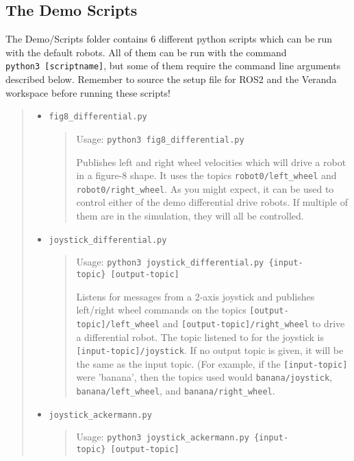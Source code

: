 \hypertarget{the-demo-scripts}{%
\subsection{The Demo Scripts}\label{the-demo-scripts}}

The Demo/Scripts folder contains 6 different python scripts which can be
run with the default robots. All of them can be run with the command
\texttt{python3\ {[}scriptname{]}}, but some of them require the command
line arguments described below. Remember to source the setup file for
ROS2 and the Veranda workspace before running these scripts!

\begin{quote}
\begin{itemize}
\item
  \texttt{fig8\_differential.py}

  \begin{quote}
  Usage: \texttt{python3\ fig8\_differential.py}

  Publishes left and right wheel velocities which will drive a robot in
  a figure-8 shape. It uses the topics \texttt{robot0/left\_wheel} and
  \texttt{robot0/right\_wheel}. As you might expect, it can be used to
  control either of the demo differential drive robots. If multiple of
  them are in the simulation, they will all be controlled.
  \end{quote}
\item
  \texttt{joystick\_differential.py}

  \begin{quote}
  Usage:
  \texttt{python3\ joystick\_differential.py\ \{input-topic\}\ {[}output-topic{]}}

  Listens for messages from a 2-axis joystick and publishes left/right
  wheel commands on the topics \texttt{{[}output-topic{]}/left\_wheel}
  and \texttt{{[}output-topic{]}/right\_wheel} to drive a differential
  robot. The topic listened to for the joystick is
  \texttt{{[}input-topic{]}/joystick}. If no output topic is given, it
  will be the same as the input topic. (For example, if the
  \texttt{{[}input-topic{]}} were 'banana', then the topics used would
  \texttt{banana/joystick}, \texttt{banana/left\_wheel}, and
  \texttt{banana/right\_wheel}.
  \end{quote}
\item
  \texttt{joystick\_ackermann.py}

  \begin{quote}
  Usage:
  \texttt{python3\ joystick\_ackermann.py\ \{input-topic\}\ {[}output-topic{]}}


\end{quote}
\end{itemize}
\end{quote}
